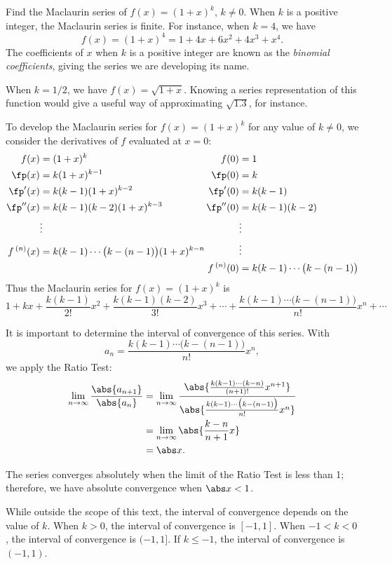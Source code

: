 \begin{example}\label{ex_ts4}%
Find the Maclaurin series of $f(x) = (1+x)^k$, $k\neq 0$.
\solution
When $k$ is a positive integer, the Maclaurin series is finite. For instance, when $k=4$, we have 
\[f(x) = (1+x)^4 = 1+4x+6x^2+4x^3+x^4.\]
The coefficients of $x$ when $k$ is a positive integer are known as the \emph{binomial coefficients}, giving the series we are developing its name.

When $k=1/2$, we have $f(x) = \sqrt{1+x}$. Knowing a series representation of this function would give a useful way of approximating $\sqrt{1.3}$, for instance.

To develop the Maclaurin series for $f(x) = (1+x)^k$ for any value of $k\neq0$, we consider the derivatives of $f$ evaluated at $x=0$:
{%
\small%
\begin{align*}
f(x) &= (1+x)^k & f(0) &= 1\\
\fp(x) &= k(1+x)^{k-1} & \fp(0) &=k\\
\fp'(x) &= k(k-1)(1+x)^{k-2} & \fp'(0) &=k(k-1)\\
\fp''(x) &= k(k-1)(k-2)(1+x)^{k-3} & \fp''(0) &=k(k-1)(k-2)\\
&\vdots & &\vdots\\
f\,^{(n)}(x) &= k(k-1)\dotsm\bigl(k-(n-1)\bigr)(1+x)^{k-n}
\mkern-3\thickmuskip&&\vdots \\
&& f\,^{(n)}(0) &=k(k-1)\dotsm\bigl(k-(n-1)\bigr)
\end{align*}}%
Thus the Maclaurin series for $f(x) = (1+x)^k$ is
\[
1+ kx + \frac{k(k-1)}{2!}x^2 + \frac{k(k-1)(k-2)}{3!}x^3 + \dotsb + \frac{k(k-1)\dotsm\bigl(k-(n-1)\bigr)}{n!}x^n+\dotsb
\]

It is important to determine the interval of convergence of this series. With 
\[a_n = \frac{k(k-1)\dotsm\bigl(k-(n-1)\bigr)}{n!}x^n,\]
we apply the Ratio Test:
\begin{align*}
	\lim_{n\to\infty}\frac{\abs{a_{n+1}}}{\abs{a_n}}
	&=\lim_{n\to\infty}\frac{\abs{\frac{k(k-1)\dotsm(k-n)}{(n+1)!}x^{n+1}}}{\abs{\frac{k(k-1)\dotsm\bigl(k-(n-1)\bigr)}{n!}x^n}}\\
		&=\lim_{n\to\infty} \abs{\frac{k-n}{n+1}x}\\
		&= \abs x.
\end{align*}

The series converges absolutely when the limit of the Ratio Test is less than 1; therefore, we have absolute convergence when $\abs x<1$. 

While outside the scope of this text, the interval of convergence depends on the value of $k$. When $k>0$, the interval of convergence is $[-1,1]$. When $-1<k<0$, the interval of convergence is $(-1,1]$. If $k\leq -1$, the interval of convergence is $(-1,1)$.
\end{example}

